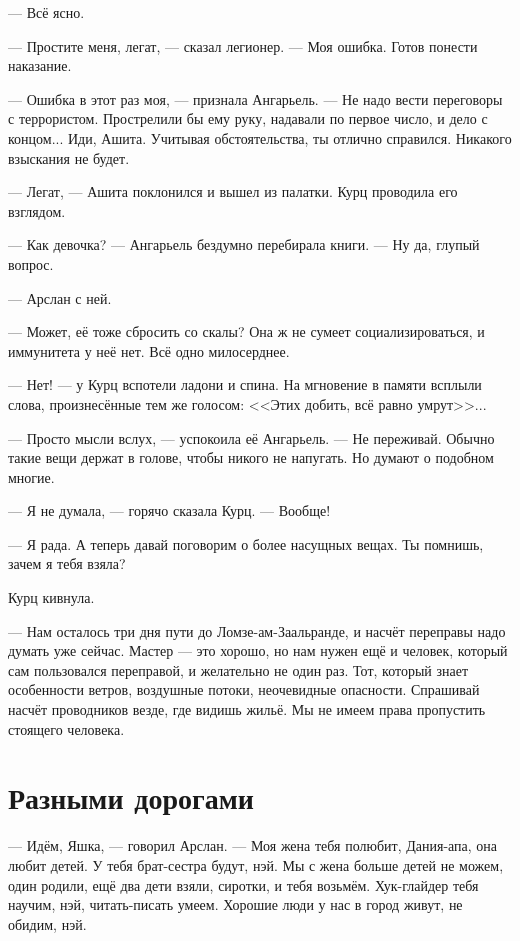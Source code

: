 --- Всё ясно.

--- Простите меня, легат, --- сказал легионер.
--- Моя ошибка.
Готов понести наказание.

--- Ошибка в этот раз моя, --- признала Ангарьель.
--- Не надо вести переговоры с террористом.
Прострелили бы ему руку, надавали по первое число, и дело с концом...
Иди, Ашита.
Учитывая обстоятельства, ты отлично справился.
Никакого взыскания не будет.

--- Легат, --- Ашита поклонился и вышел из палатки.
Курц проводила его взглядом.

--- Как девочка? --- Ангарьель бездумно перебирала книги.
--- Ну да, глупый вопрос.

--- Арслан с ней.

--- Может, её тоже сбросить со скалы?
Она ж не сумеет социализироваться, и иммунитета у неё нет.
Всё одно милосерднее.

--- Нет! --- у Курц вспотели ладони и спина.
На мгновение в памяти всплыли слова, произнесённые тем же голосом:
<<Этих добить, всё равно умрут>>...

--- Просто мысли вслух, --- успокоила её Ангарьель.
--- Не переживай.
Обычно такие вещи держат в голове, чтобы никого не напугать.
Но думают о подобном многие.

--- Я не думала, --- горячо сказала Курц.
--- Вообще!

--- Я рада.
А теперь давай поговорим о более насущных вещах.
Ты помнишь, зачем я тебя взяла?

Курц кивнула.

--- Нам осталось три дня пути до Ломзе-ам-Заальранде, и насчёт переправы надо думать уже сейчас.
Мастер --- это хорошо, но нам нужен ещё и человек, который сам пользовался переправой, и желательно не один раз.
Тот, который знает особенности ветров, воздушные потоки, неочевидные опасности.
Спрашивай насчёт проводников везде, где видишь жильё.
Мы не имеем права пропустить стоящего человека.

\section{Разными дорогами}

--- Идём, Яшка, --- говорил Арслан.
--- Моя жена тебя полюбит, Дания-апа, она любит детей.
У тебя брат-сестра будут, нэй.
Мы с жена больше детей не можем, один родили, ещё два дети взяли, сиротки, и тебя возьмём.
Хук-глайдер тебя научим, нэй, читать-писать умеем.
Хорошие люди у нас в город живут, не обидим, нэй.

